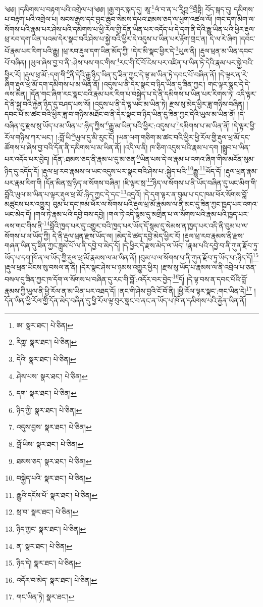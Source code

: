 \setcounter{footnote}{0} 
༄༅། །དམིགས་པ་བརྟག་པའི་འགྲེལ་པ།༄༅། །རྒྱ་གར་སྐད་དུ། ཨཱ་\footnote{ཨ་  སྣར་ཐང་།  པེ་ཅིན། }ལཾ་བ་ན་པ་རཱིཀྵ་\footnote{རིཀྵ་  སྣར་ཐང་།  པེ་ཅིན། }བྲྀཏྟི། བོད་སྐད་དུ། དམིགས་པ་བརྟག་པའི་འགྲེལ་པ། སངས་རྒྱས་དང་བྱང་ཆུབ་སེམས་དཔའ་ཐམས་ཅད་ལ་ཕྱག་འཚལ་ལོ། །གང་དག་མིག་ལ་སོགས་པའི་རྣམ་པར་ཤེས་པའི་དམིགས་པ་ཕྱི་རོལ་གྱི་དོན་ཡིན་པར་འདོད་པ་དེ་དག་ནི་དེའི་རྒྱུ་ཡིན་པའི་ཕྱིར་རྡུལ་ཕྲ་རབ་དག་ཡིན་པའམ་དེར་སྣང་བའི་ཤེས་པ་སྐྱེ་བའི་ཕྱིར་དེ་འདུས་པ་ཡིན་པར་རྟོག་གྲང་ན། དེ་ལ་རེ་ཞིག །དབང་པོ་རྣམ་པར་རིག་པའི་རྒྱུ། །ཕྲ་རབ་རྡུལ་དག་ཡིན་མོད་ཀྱི། །དེར་མི་སྣང་ཕྱིར་དེ་\footnote{དེའི་  སྣར་ཐང་།  པེ་ཅིན། }ཡུལ་ནི། །རྡུལ་ཕྲན་མ་ཡིན་དབང་པོ་བཞིན། །ཡུལ་ཞེས་བྱ་བ་ནི་:ཤེས་པས་གང་གིས་\footnote{ཤེས་པས་  སྣར་ཐང་།  པེ་ཅིན། }རང་གི་ངོ་བོ་ངེས་པར་འཛིན་པ་ཡིན་ཏེ་དེའི་རྣམ་པར་སྐྱེ་བའི་ཕྱིར་རོ། །རྡུལ་ཕྲ་མོ་:དག་གི་\footnote{དག་  སྣར་ཐང་།  པེ་ཅིན། }ནི་དེའི་རྒྱུ་ཉིད་ཡིན་དུ་ཟིན་ཀྱང་དེ་ལྟ་མ་ཡིན་ཏེ་དབང་པོ་བཞིན་ནོ། །དེ་ལྟར་ན་རེ་ཞིག་རྡུལ་ཕྲ་མོ་དག་དམིགས་པ་མ་ཡིན་ནོ། །འདུས་པ་ནི་དེར་སྣང་བ་ཉིད་ཡིན་དུ་ཟིན་ཀྱང་། གང་ལྟར་སྣང་དེ་དེ་ལས་མིན། །དོན་གང་ཞིག་རང་སྣང་བའི་རྣམ་པར་རིག་པ་བསྐྱེད་པ་དེ་ནི་དམིགས་པ་ཡིན་པར་རིགས་ཏེ། འདི་ལྟར་དེ་ནི་སྐྱ་བའི་རྐྱེན་ཉིད་དུ་བཤད་པས་སོ། །འདུས་པ་ནི་དེ་ལྟ་ཡང་མ་ཡིན་ཏེ། རྫས་སུ་མེད་ཕྱིར་ཟླ་གཉིས་བཞིན། །དབང་པོ་མ་ཚང་བའི་ཕྱིར་ཟླ་བ་གཉིས་མཐོང་བ་ནི་དེར་སྣང་བ་ཉིད་ཡིན་དུ་ཟིན་ཀྱང་དེའི་ཡུལ་མ་ཡིན་ནོ། །དེ་བཞིན་དུ་རྫས་སུ་ཡོད་པ་མ་ཡིན་པ་:ཉིད་ཀྱིས་\footnote{ཉིད་ཀྱི་  སྣར་ཐང་།  པེ་ཅིན། }རྒྱུ་མ་ཡིན་པའི་ཕྱིར་:འདུས་པ་\footnote{འདུས་བྱས་  སྣར་ཐང་།  པེ་ཅིན། }དམིགས་པ་མ་ཡིན་ནོ། །དེ་ལྟར་ཕྱི་རོལ་གཉིས་ཀར་ཡང་། །:བློ་ཡི་\footnote{བློ་ཡིས་  སྣར་ཐང་།  པེ་ཅིན། }ཡུལ་དུ་མི་རུང་ངོ། །ཡན་ལག་གཅིག་མ་ཚང་བའི་ཕྱིར་ཕྱི་རོལ་གྱི་རྡུལ་ཕྲ་མོ་དང་ཚོགས་པ་ཞེས་བྱ་བའི་དོན་ནི་དམིགས་པ་མ་ཡིན་ནོ། །འདི་ལ་ནི། ཁ་ཅིག་འདུས་པའི་རྣམ་པ་དག །སྒྲུབ་པ་ཡིན་པར་འདོད་པར་བྱེད། །དོན་:ཐམས་ཅད་ནི་རྣམ་པ་དུ་མ་ཅན་\footnote{ཐམས་ཅད་  སྣར་ཐང་།  པེ་ཅིན། }ཡིན་པས་དེ་ལ་རྣམ་པ་འགའ་ཞིག་གིས་མངོན་སུམ་ཉིད་དུ་འདོད་དོ། །རྡུལ་ཕྲ་རབ་རྣམས་ལ་ཡང་འདུས་པར་སྣང་བའི་ཤེས་པ་:སྐྱེད་པའི་\footnote{བསྐྱེད་པའི་  སྣར་ཐང་།  པེ་ཅིན། }རྒྱུ་\footnote{རྒྱུའི་དངོས་པོ་  སྣར་ཐང་།  པེ་ཅིན། }ཡོད་དོ། །རྡུལ་ཕྲན་རྣམ་པར་རྣམ་རིག་གི །དོན་མིན་སྲ་ཉིད་ལ་སོགས་བཞིན། །ཇི་ལྟར་སྲ་\footnote{སྲ་བ་  སྣར་ཐང་།  པེ་ཅིན། }ཉིད་ལ་སོགས་པ་ནི་ཡོད་བཞིན་དུ་ཡང་མིག་གི་བློའི་ཡུལ་མ་ཡིན་པ་ལྟར་རྡུལ་ཕྲ་མོ་:ཉིད་ཀྱང་དེ་དང་\footnote{ཉིད་ཀྱང་  སྣར་ཐང་།  པེ་ཅིན། }འདྲའོ། །དེ་དག་ལྟར་ན་བུམ་པ་དང་ཁམ་ཕོར་སོགས་བློ་མཚུངས་པར་འགྱུར། བུམ་པ་དང་ཁམ་ཕོར་ལ་སོགས་པའི་རྡུལ་ཕྲ་མོ་རྣམས་ལ་ནི་མང་དུ་ཟིན་ཀྱང་ཁྱད་པར་འགའ་ཡང་མེད་དོ། །གལ་ཏེ་རྣམ་པའི་དབྱེ་བས་དབྱེ། །གལ་ཏེ་འདི་སྙམ་དུ་མགྲིན་པ་ལ་སོགས་པའི་རྣམ་པའི་ཁྱད་པར་ལས་གང་གིས་ནི་\footnote{ན་  སྣར་ཐང་།  པེ་ཅིན། }བློའི་ཁྱད་པར་དུ་འགྱུར་བའི་ཁྱད་པར་ཡོད་དོ་སྙམ་དུ་སེམས་ན་ཁྱད་པར་འདི་ནི་བུམ་པ་ལ་སོགས་པ་ལ་ཡོད་ཀྱི། དེ་ནི་རྡུལ་ཕྲན་རྫས་ཡོད་ལ། །མེད་དེ་ཚད་དབྱེ་མེད་ཕྱིར་རོ། །རྡུལ་ཕྲ་རབ་རྣམས་ནི་རྫས་གཞན་ཡིན་དུ་ཟིན་ཀྱང་ཟླུམ་པོ་ལ་ནི་དབྱེ་བ་མེད་དོ། །དེ་ཕྱིར་དེ་རྫས་མེད་ལ་ཡོད། །རྣམ་པའི་དབྱེ་བ་ནི་ཀུན་རྫོབ་ཏུ་ཡོད་པ་དག་ཁོ་ན་ལ་ཡོད་ཀྱི་རྡུལ་ཕྲ་མོ་རྣམས་ལ་མ་ཡིན་ནོ། །བུམ་པ་ལ་སོགས་པ་ནི་ཀུན་རྫོབ་ཏུ་ཡོད་པ་:ཉིད་དོ།\footnote{ཉིད་དེ།  སྣར་ཐང་།  པེ་ཅིན། } །རྡུལ་ཕྲན་ཡོངས་སུ་བསལ་ན་ནི། །དེར་སྣང་ཤེས་པ་ཉམས་འགྱུར་ཕྱིར། །རྫས་སུ་ཡོད་པ་རྣམས་ལ་ནི་འབྲེལ་པ་ཅན་བསལ་དུ་ཟིན་ཀྱང་ཁ་དོག་ལ་སོགས་པ་བཞིན་དུ་རང་གི་བློ་:འདོར་བར་བྱེད་\footnote{འདོར་བ་མེད་  སྣར་ཐང་།  པེ་ཅིན། }དོ། །དེ་ལྟ་བས་ན་དབང་པོའི་བློ་རྣམས་ཀྱི་ཡུལ་ནི་ཕྱི་རོལ་ན་མ་ཡིན་པར་འཐད་དོ། །ནང་གི་ཤེས་བྱའི་ངོ་བོ་ནི། །ཕྱི་རོལ་ལྟར་སྣང་:གང་ཡིན་དེ།\footnote{གང་ཡིན་ཏེ།  སྣར་ཐང་། } །དོན་ཡིན་ཕྱི་རོལ་གྱི་དོན་མེད་བཞིན་དུ་ཕྱི་རོལ་ལྟ་བུར་སྣང་བ་ནང་ན་ཡོད་པ་ཁོ་ན་དམིགས་པའི་རྐྱེན་ཡིན་ནོ། 